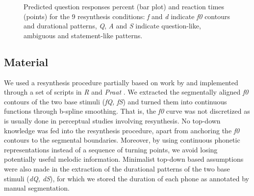 \begin{figure}
\centering
{}
\caption{Predicted question responses percent (bar plot) and reaction times (points) for the 9 resynthesis conditions: \textit{f} and \textit{d} indicate \textit{f0} contours and durational patterns, \textit{Q}, \textit{A} and \textit{S} indicate question-like, ambiguous and statement-like patterns.}
\label{fig501}\end{figure}

\subsection{Material}\label{sec522}
We used a resynthesis procedure partially based on work by \citet{gubian2010automatic,gubian2011joint} and implemented through a set of scripts in \textit{R} \citep{r2008r} and \textit{Praat} \citep{boersma2008praat}. We extracted the segmentally aligned \textit{f0} contours of the two base stimuli (\textit{fQ, fS}) and turned them into continuous functions through b-spline smoothing. That is, the \textit{f0} curve was not discretized as is usually done in perceptual studies involving resynthesis. No top-down knowledge was fed into the resynthesis procedure, apart from anchoring the \textit{f0} contours to the segmental boundaries. Moreover, by using continuous phonetic representations instead of a sequence of turning points, we avoid losing potentially useful melodic information. Minimalist top-down based assumptions were also made in the extraction of the durational patterns of the two base stimuli (\textit{dQ, dS}), for which we stored the duration of each phone as annotated by manual segmentation.

